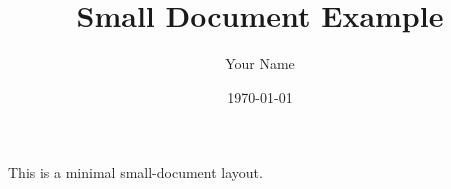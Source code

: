 \documentclass[11pt]{article}
\title{Small Document Example}
\author{Your Name}
\date{\today}
\begin{document}
\maketitle

This is a minimal small-document layout.
\end{document}
